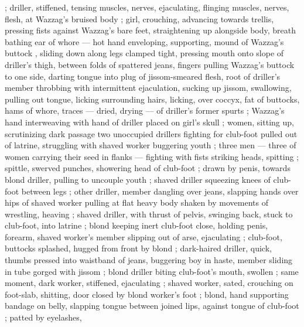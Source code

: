 ; driller, stiffened, tensing muscles, nerves, ejaculating, flinging muscles, nerves, flesh, at Wazzag's bruised body ; girl, crouching, advancing towards trellis, pressing fists against Wazzag's bare feet, straightening up alongside body, breath bathing ear of whore --- hot hand enveloping, supporting, mound of Wazzag's buttock , sliding down along legs clamped tight, pressing mouth onto slope of driller's thigh, between folds of spattered jeans, fingers pulling Wazzag's buttock to one side, darting tongue into plug of jissom-smeared flesh, root of driller's member throbbing with intermittent ejaculation, sucking up jissom, swallowing, pulling out tongue, licking surrounding hairs, licking, over coccyx, fat of buttocks, hams of whore, traces --- dried, drying --- of driller's former spurts ; Wazzag's hand interweaving with hand of driller placed on girl's skull ; women, sitting up, scrutinizing dark passage {\col} two unoccupied drillers fighting for club-foot pulled out of latrine, struggling with shaved worker buggering youth ; three men --- three of women carrying their seed in flanks --- fighting with fists striking heads, spitting ; spittle, swerved punches, showering head of club-foot ; drawn by penis, towards blond driller, pulling to uncouple youth ; shaved driller squeezing knees of club-foot between legs ; other driller, member dangling over jeans, slapping hands over hips of shaved worker pulling at flat heavy body shaken by movements of wrestling, heaving ; shaved driller, with thrust of pelvis, swinging back, stuck to club-foot, into latrine ; blond keeping inert club-foot close, holding penis, forearm, shaved worker's member slipping out of arse, ejaculating ; club-foot, buttocks splashed, hugged from front by blond ; dark-haired driller, quick, thumbs pressed into waistband of jeans, buggering boy in haste, member sliding in tube gorged with jissom ; blond driller biting club-foot's mouth, swollen ; same moment, dark worker, stiffened, ejaculating ; shaved worker, sated, crouching on foot-slab, shitting, door closed by blond worker's foot ; blond, hand supporting bandage on belly, slapping tongue between joined lips, against tongue of club-foot ; patted by eyelashes, 

